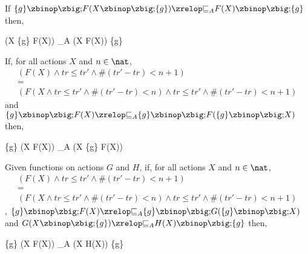 \begin{law}
  \label{rec-assump-distr-law}
  If $\{g\} \circseq F(X \circseq \{g\}) \circrefines_A F(X) \circseq \{g\}$ then,
  \begin{circus}
    (\circmu X \circspot \{g\} \circseq F(X))
    \circrefines_A
    (\circmu X \circspot F(X)) \circseq \{g\}
  \end{circus}
\end{law}

\begin{law}
  \label{assump-rec-distl-law}
  If, for all actions $X$ and $n \in \nat$,
  \[\begin{array}{l}
      (F(X) \land tr \leq tr' \land \# (tr'-tr) < n + 1) \\
      {} = {} \\
      (F(X \land tr \leq tr' \land \# (tr'-tr) < n) \land tr \leq tr' \land \# (tr'-tr) < n + 1)
    \end{array}\]
  and $\{g\} \circseq F(X) \circrefines_A \{g\} \circseq F(\{g\} \circseq X)$ then,
  \begin{circus}
    \{g\} \circseq (\circmu X \circspot F(X))
    \circrefines_A
    (\circmu X \circspot \{g\} \circseq F(X))
  \end{circus}
\end{law}

\begin{law}
  \label{assump-rec-dist-refine-law}
  Given functions on actions $G$ and $H$,
  if, for all actions $X$ and $n \in \nat$,
  \[\begin{array}{l}
      (F(X) \land tr \leq tr' \land \# (tr'-tr) < n + 1) \\
      {} = {} \\
      (F(X \land tr \leq tr' \land \# (tr'-tr) < n) \land tr \leq tr' \land \# (tr'-tr) < n + 1)
    \end{array}\],
  $\{g\} \circseq F(X) \circrefines_A \{g\} \circseq G(\{g\} \circseq
  X)$ and $G(X \circseq \{g\}) \circrefines_A H(X) \circseq \{g\}$
  then,
  \begin{circus}
    \{g\} \circseq (\circmu X \circspot F(X))
    \circrefines_A
    (\circmu X \circspot H(X)) \circseq \{g\}
  \end{circus}
\end{law}

